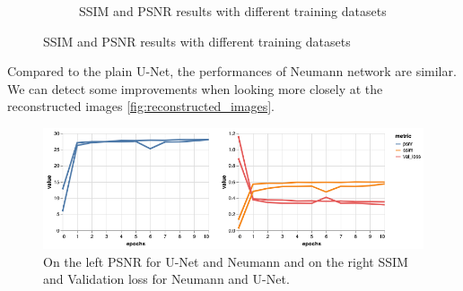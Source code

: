 \documentclass{article}
\begin{document}
\begin{figure}[H]
\begin{subfigure}[b]{.5\textwidth}
		\caption{SSIM and PSNR results with different training datasets}
    \end{subfigure}%
\end{figure}

Compared to the plain U-Net, the performances of Neumann network are similar. We can detect some improvements when looking more closely at the reconstructed images  \ref{fig:reconstructed_images}.
	\begin{figure}[H]
		\centering
		\captionsetup{justification=centering}
		\includegraphics[width=\textwidth]{unet_neumann}
		\caption{On the left PSNR for U-Net and Neumann and on the right SSIM and Validation loss for Neumann and U-Net.}
	\end{figure}
\end{document}
